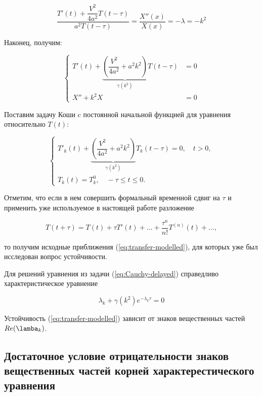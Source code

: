 \begin{equation}
\dfrac{T'(t) + \dfrac{V^2}{4a^2} T(t-\tau)}{a^2 T(t-\tau)} = \dfrac{X''(x)}{X(x)} = -\lambda = -k^2
\end{equation}

Наконец, получим:

\begin{equation}
\left\{
\begin{aligned}
T'(t) + \underbrace{ \left( \dfrac{V^2}{4a^2} + a^2 k^2 \right)}_{\gamma(k^2)} T(t-\tau) & = 0\\
X'' + k^2 X & = 0
\end{aligned}
\right.
\end{equation}

Поставим задачу Коши c постоянной начальной функцией для уравнения относительно $T(t)$:

\begin{equation}\label{eq:Cauchy-delayed}
\left\{
\begin{aligned}
T'_k (t) + \underbrace{ \left( \dfrac{V^2}{4a^2} + a^2 k^2 \right)}_{\gamma(k^2)} T_k (t-\tau) = 0, \quad t>0,\\
T_k (t) = T_{k}^{0}, \quad -\tau \leq t \leq 0.
\end{aligned}
\right.
\end{equation}

Отметим, что если в нем совершить формальный временной сдвиг на $\tau$ и применить уже используемое в настоящей работе разложение

\begin{equation}
T(t+\tau) = T(t) + \tau T'(t) + \dots + \dfrac{\tau^n}{n!} T^{(n)} (t) + \dots,
\end{equation}

то получим исходные приближения (\ref{eq:transfer-modelled}), для которых уже был исследован вопрос устойчивости.

Для решений уравнения из задачи (\ref{eq:Cauchy-delayed}) справедливо характеристическое уравнение

\begin{equation}
\lambda_k + \gamma(k^2) e^{-\lambda_k \tau} = 0
\end{equation}

Устойчивость (\ref{eq:transfer-modelled}) зависит от знаков вещественных частей $Re(\lamba_k)$.

\subsection{Достаточное условие отрицательности знаков вещественных частей корней характерестического уравнения}

